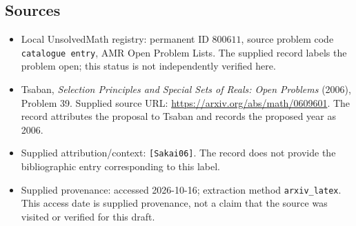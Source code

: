 \documentclass[11pt]{article}
\begin{document}
\subsection{Sources}
\begin{itemize}
\item Local UnsolvedMath registry: permanent ID \(800611\), source problem code \texttt{catalogue entry}, AMR Open Problem Lists. The supplied record labels the problem open; this status is not independently verified here.
\item Tsaban, \emph{Selection Principles and Special Sets of Reals: Open Problems} (2006), Problem 39. Supplied source URL: \url{https://arxiv.org/abs/math/0609601}. The record attributes the proposal to Tsaban and records the proposed year as 2006.
\item Supplied attribution/context: \texttt{[Sakai06]}. The record does not provide the bibliographic entry corresponding to this label.
\item Supplied provenance: accessed 2026-10-16; extraction method \texttt{arxiv\_latex}. This access date is supplied provenance, not a claim that the source was visited or verified for this draft.
\end{itemize}
\end{document}
